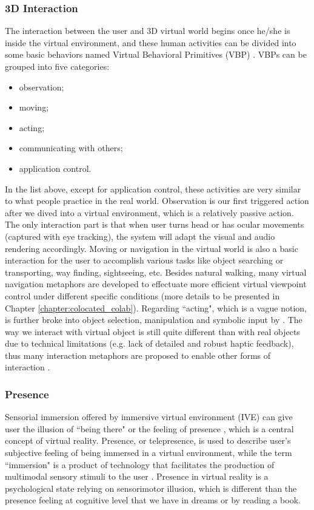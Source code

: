 \subsubsection{3D Interaction}
\label{sec:3D_inter}
The interaction between the user and 3D virtual world begins once he/she is inside the virtual environment, and these human activities can be divided into some basic behaviors named Virtual Behavioral Primitives (VBP) \citet{Fuchs2011Book}. VBPs can be grouped into five categories:

\begin{itemize}
  \item observation;
  \item moving;
  \item acting;
  \item communicating with others;
  \item application control.
\end{itemize}

In the list above, except for application control, these activities are very similar to what people practice in the real world. Observation is our first triggered action after we dived into a virtual environment, which is a relatively passive action. The only interaction part is that when user turns head or has ocular movements (captured with eye tracking), the system will adapt the visual and audio rendering accordingly. Moving or navigation in the virtual world is also a basic interaction for the user to accomplish various tasks like object searching or transporting, way finding, sightseeing, etc. Besides natural walking, many virtual navigation metaphors are developed to effectuate more efficient virtual viewpoint control under different specific conditions (more details to be presented in Chapter \ref{chapter:colocated_colab}). Regarding ``acting", which is a vague notion, is further broke into object selection, manipulation and symbolic input by \citet{Bowman2004UIT}. The way we interact with virtual object is still quite different than with real objects due to technical limitations (e.g. lack of detailed and robust haptic feedback), thus many interaction metaphors are proposed to enable other forms of interaction \citep{Hand1997Survey}.


\subsubsection{Presence}
Sensorial immersion offered by immersive virtual environment (IVE) can give user the illusion of ``being there" or the feeling of presence \citep{Heeter1992Presence}, which is a central concept of virtual reality. Presence, or telepresence, is used to describe user's subjective feeling of being immersed in a virtual environment, while the term ``immersion" is a product of technology that facilitates the production of multimodal sensory stimuli to the user \citep{Slater1994DepthPre, Bystrom1999Model}. Presence in virtual reality is a psychological state relying on sensorimotor illusion, which is different than the presence feeling at cognitive level that we have in dreams or by reading a book.

